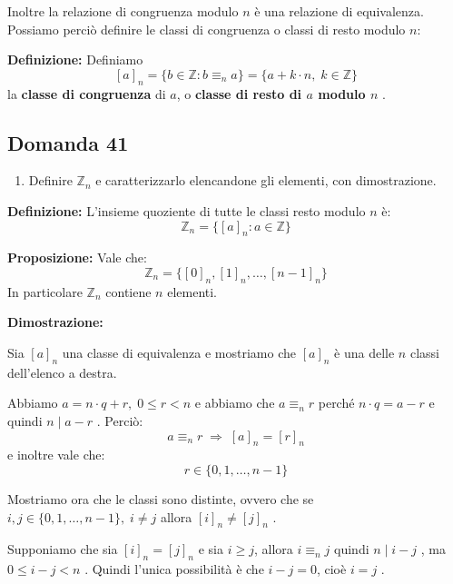 \documentclass[
  a4paper,
]{article}
\providecommand{\tightlist}{%
  \setlength{\itemsep}{0pt}\setlength{\parskip}{0pt}}
\providecommand{\tightlist}{}
\begin{document}
\bigskip

Inoltre la relazione di congruenza modulo \(n\) è una relazione di
equivalenza. Possiamo perciò definire le classi di congruenza o classi
di resto modulo \(n\):

\textbf{Definizione:} Definiamo \[
\left[a\right]_n = \{b \in \mathbb{Z} : b \equiv_n a\} = \{a + k \cdot n,\; k \in \mathbb{Z}\}
\] la \textbf{classe di congruenza} di \(a\), o \textbf{classe di resto
di \(a\) modulo \(n\)} .

\hypertarget{domanda-41}{%
\subsection{Domanda 41}\label{domanda-41}}

\begin{observationbox}[Domanda]
\begin{enumerate}
\def\labelenumi{\arabic{enumi}.}
\setcounter{enumi}{40}
\tightlist
\item
  Definire \(\mathbb{Z}_n\) e caratterizzarlo elencandone gli elementi,
  con dimostrazione.
\end{enumerate}
\end{observationbox}

\textbf{Definizione:} L'insieme quoziente di tutte le classi resto
modulo \(n\) è: \[
\mathbb{Z}_n = \{\left[a\right]_n : a \in \mathbb{Z}\}
\]

\textbf{Proposizione:} Vale che: \[
\mathbb{Z}_n = \{[0]_n, [1]_n, \dots, [n-1]_n \}
\] In particolare \(\mathbb{Z}_n\) contiene \(n\) elementi.

\textbf{Dimostrazione:}

Sia \(\left[a\right]_n\) una classe di equivalenza e mostriamo che
\(\left[a\right]_n\) è una delle \(n\) classi dell'elenco a destra.

Abbiamo \(a = n \cdot q + r, \; 0 \le r < n\) e abbiamo che
\(a \equiv_n r\) perché \(n \cdot q = a -r\) e quindi \(n \mid a-r\) .
Perciò: \[
a \equiv_n r \; \Longrightarrow \; \left[a\right]_n = [r]_n
\] e inoltre vale che: \[
r \in \{0, 1, \dots, n-1\}
\]

Mostriamo ora che le classi sono distinte, ovvero che se
\(i, j \in \{0, 1, \dots, n-1\}, \; i \neq j\) allora
\([i]_n \neq [j]_n\) .

Supponiamo che sia \([i]_n = [j]_n\) e sia \(i \ge j\), allora
\(i \equiv_n j\) quindi \(n \mid i - j\) , ma \(0 \leq i - j < n\) .
Quindi l'unica possibilità è che \(i - j = 0\), cioè \(i = j\) .
\end{document}
